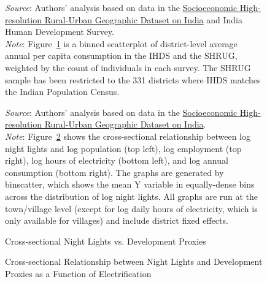 \documentclass[12pt,letterpaper]{article}
\begin{document}
\begin{appendix}
\begin{figure}[H]
\begin{adjustwidth}{2cm}{2cm}
\footnotesize{\textit{Source}: Authors' analysis based on data in the
  \href{http://www.devdatalab.org/shrug}{Socioeconomic High-resolution
    Rural-Urban Geographic Dataset on India} and India Human
  Development Survey. \\ \textit{Note}: Figure~\ref{fig:ihds_shrug_cons_binscatter} is a binned
  scatterplot of district-level average annual per capita consumption in the
  IHDS and the SHRUG, weighted by the count of individuals in each
  survey. The SHRUG sample has been restricted to the 331 districts where
  IHDS matches the Indian Population Census.}
\end{adjustwidth}

\label{fig:ihds_shrug_cons_binscatter}
\end{figure}

\newpage
\begin{figure}[H]\caption{Cross-sectional Night Lights vs. Development Proxies}
  \begin{center}
  \end{center}

\begin{adjustwidth}{2cm}{2cm}
  \footnotesize{\textit{Source}: Authors' analysis based on data in the
  \href{http://www.devdatalab.org/shrug}{Socioeconomic High-resolution
    Rural-Urban Geographic Dataset on India}. \\ \textit{Note}: Figure~\ref{fig:nl_xvars} shows the cross-sectional
    relationship between log night lights and log population (top
    left), log employment (top right), log hours of electricity
    (bottom left), and log annual consumption (bottom right). The
    graphs are generated by binscatter, which shows the mean Y
    variable in equally-dense bins across the distribution of log
    night lights. All graphs are run at the town/village level (except
    for log daily hours of electricity, which is only available for
    villages) and include district fixed effects.}
\end{adjustwidth}

\label{fig:nl_xvars}
\end{figure}

\begin{figure}[H]\caption{Cross-sectional Relationship between Night Lights and Development Proxies \cnewline as a Function of Electrification}
  \begin{center}
  \end{center}
  

\end{figure}
\end{appendix}
\end{document}
